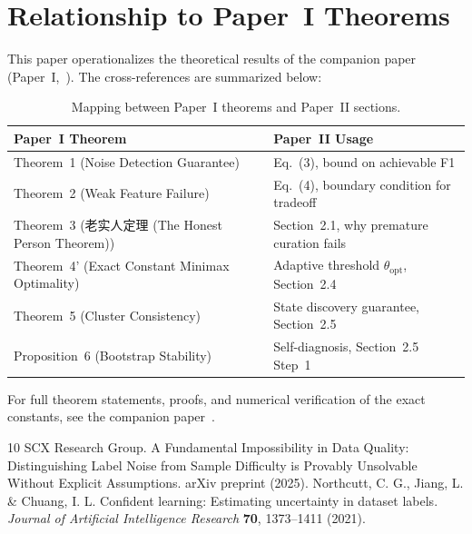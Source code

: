 \documentclass[11pt]{article}
\begin{document}
\section{Relationship to Paper~I Theorems}

This paper operationalizes the theoretical results of the companion paper (Paper~I,~\cite{xi2025fundamental}). The cross-references are summarized below:

\begin{table}[h]
\centering
\caption{Mapping between Paper~I theorems and Paper~II sections.}
\label{tab:crossref}
\begin{tabular}{ll}
\hline
Paper~I Theorem & Paper~II Usage \\
\hline
Theorem~1 (Noise Detection Guarantee) & Eq.~(3), bound on achievable F1 \\
Theorem~2 (Weak Feature Failure) & Eq.~(4), boundary condition for tradeoff \\
Theorem~3 (老实人定理 (The Honest Person Theorem)) & Section~2.1, why premature curation fails \\
Theorem~4' (Exact Constant Minimax Optimality) & Adaptive threshold $\theta_{\text{opt}}$, Section~2.4 \\
Theorem~5 (Cluster Consistency) & State discovery guarantee, Section~2.5 \\
Proposition~6 (Bootstrap Stability) & Self-diagnosis, Section~2.5 Step~1 \\
\hline
\end{tabular}
\end{table}

For full theorem statements, proofs, and numerical verification of the exact constants, see the companion paper~\cite{xi2025fundamental}.

\begin{thebibliography}{10}
 SCX Research Group. A Fundamental Impossibility in Data Quality: Distinguishing Label Noise from Sample Difficulty is Provably Unsolvable Without Explicit Assumptions. arXiv preprint (2025).
 Northcutt, C. G., Jiang, L. \& Chuang, I. L. Confident learning: Estimating uncertainty in dataset labels. \textit{Journal of Artificial Intelligence Research} \textbf{70}, 1373--1411 (2021).
\end{thebibliography}
\end{document}
